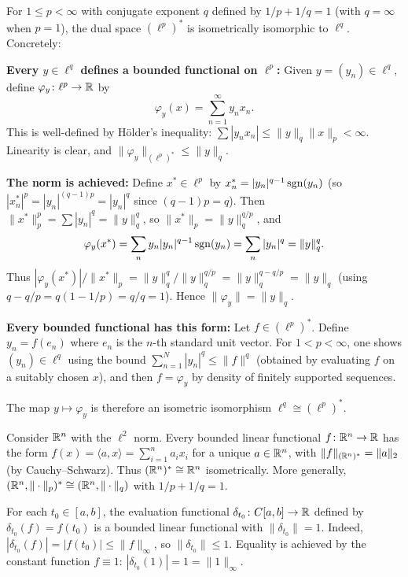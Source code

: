 \documentclass[11pt,a4paper]{article}
\begin{document}
\begin{example}
\label{ex:dual_lp}
For $1 \le p < \infty$ with conjugate exponent $q$ defined by
$1/p + 1/q = 1$ (with $q = \infty$ when $p = 1$), the dual space
$(\ell^p)^*$ is isometrically isomorphic to $\ell^q$. Concretely:

\textbf{Every $y \in \ell^q$ defines a bounded functional on $\ell^p$:}
Given $y = (y_n) \in \ell^q$, define $\varphi_y \colon \ell^p \to \mathbb{R}$ by
\[
\varphi_y(x) = \sum_{n=1}^\infty y_n x_n.
\]
This is well-defined by H\"older's inequality:
$\sum |y_n x_n| \le \|y\|_q \|x\|_p < \infty$. Linearity is clear, and
$\|\varphi_y\|_{(\ell^p)^*} \le \|y\|_q$.

\textbf{The norm is achieved:} Define $x^* \in \ell^p$ by
$x_n^* = |y_n|^{q-1} \operatorname{sgn}(y_n)$ (so $|x_n^*|^p = |y_n|^{(q-1)p} =
|y_n|^q$ since $(q-1)p = q$). Then $\|x^*\|_p^p = \sum |y_n|^q =
\|y\|_q^q$, so $\|x^*\|_p = \|y\|_q^{q/p}$, and
\[
\varphi_y(x^*) = \sum_n y_n |y_n|^{q-1} \operatorname{sgn}(y_n)
= \sum_n |y_n|^q = \|y\|_q^q.
\]
Thus $|\varphi_y(x^*)| / \|x^*\|_p = \|y\|_q^q / \|y\|_q^{q/p} =
\|y\|_q^{q - q/p} = \|y\|_q$ (using $q - q/p = q(1 - 1/p) = q/q = 1$).
Hence $\|\varphi_y\| = \|y\|_q$.

\textbf{Every bounded functional has this form:} Let
$f \in (\ell^p)^*$. Define $y_n = f(e_n)$ where $e_n$ is the $n$-th
standard unit vector. For $1 < p < \infty$, one shows
$(y_n) \in \ell^q$ using the bound $\sum_{n=1}^N |y_n|^q \le \|f\|^q$
(obtained by evaluating $f$ on a suitably chosen $x$), and then
$f = \varphi_y$ by density of finitely supported sequences.

The map $y \mapsto \varphi_y$ is therefore an isometric isomorphism
$\ell^q \cong (\ell^p)^*$.
\end{example}

\begin{example}[Dual of $\R^n$]
\label{ex:dual_Rn}
Consider $\R^n$ with the $\ell^2$ norm. Every bounded linear functional
$f \colon \mathbb{R}^n \to \mathbb{R}$ has the form $f(x) = \langle a, x \rangle =
\sum_{i=1}^n a_i x_i$ for a unique $a \in \mathbb{R}^n$, with
$\|f\|_{(\mathbb{R}^n)^*} = \|a\|_2$ (by Cauchy--Schwarz). Thus $(\mathbb{R}^n)^* \cong
\mathbb{R}^n$ isometrically. More generally, $(\mathbb{R}^n, \|\cdot\|_p)^* \cong
(\mathbb{R}^n, \|\cdot\|_q)$ with $1/p + 1/q = 1$.
\end{example}

\begin{example}
\label{ex:eval_functional}
For each $t_0 \in [a,b]$, the evaluation functional
$\delta_{t_0} \colon C[a,b] \to \mathbb{R}$ defined by $\delta_{t_0}(f) = f(t_0)$ is
a bounded linear functional with $\|\delta_{t_0}\| = 1$. Indeed,
$|\delta_{t_0}(f)| = |f(t_0)| \le \|f\|_\infty$, so $\|\delta_{t_0}\| \le 1$.
Equality is achieved by the constant function $f \equiv 1$:
$|\delta_{t_0}(1)| = 1 = \|1\|_\infty$.
\end{example}
\end{document}
